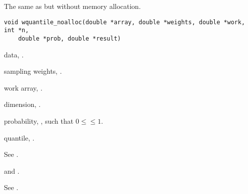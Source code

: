 \documentclass[a4paper,oneside,10pt,DIV=12]{scrreprt}
\begin{document}
\begin{Description}
The same as  but without memory allocation.
\end{Description}
\begin{Usage}
\begin{verbatim}
void wquantile_noalloc(double *array, double *weights, double *work, int *n,
    double *prob, double *result)
\end{verbatim}
\end{Usage}
\begin{Arguments}
	\begin{ldescription}
		\item[\code{array}] data, . 

		\item[\code{weights}] sampling weights, . 

		\item[\code{work}] work array, . 

		\item[\code{n}] dimension, . 

		\item[\code{prob}] probability, , such that 
			$0 \leq$$\leq 1$. 

		\item[\code{result}] quantile, . 
	\end{ldescription}
\end{Arguments}
\begin{Details}
	See .
\end{Details}
\begin{Dependencies}
	 and .
\end{Dependencies}
\begin{Value}
	See .
\end{Value}
\end{document}
